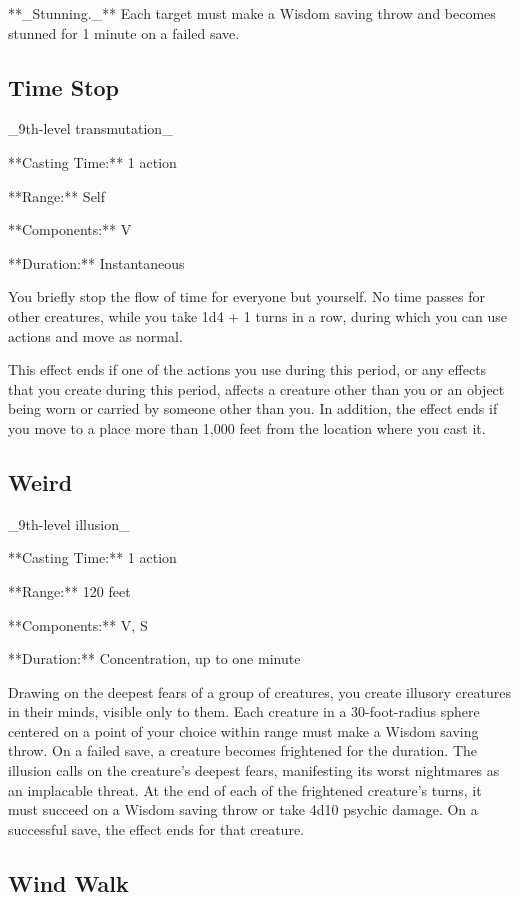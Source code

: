 **_Stunning._** Each target must make a Wisdom saving throw and becomes stunned for 1 minute on a failed save.

\subsection{Time Stop}

_9th-level transmutation_

**Casting Time:** 1 action

**Range:** Self

**Components:** V

**Duration:** Instantaneous

You briefly stop the flow of time for everyone but yourself. No time passes for other creatures, while you take 1d4 + 1 turns in a row, during which you can use actions and move as normal.

This effect ends if one of the actions you use during this period, or any effects that you create during this period, affects a creature other than you or an object being worn or carried by someone other than you. In addition, the effect ends if you move to a place more than 1,000 feet from the location where you cast it.

\subsection{Weird}

_9th-level illusion_

**Casting Time:** 1 action

**Range:** 120 feet

**Components:** V, S

**Duration:** Concentration, up to one minute

Drawing on the deepest fears of a group of creatures, you create illusory creatures in their minds, visible only to them. Each creature in a 30-foot-radius sphere centered on a point of your choice within range must make a Wisdom saving throw. On a failed save, a creature becomes frightened for the duration. The illusion calls on the creature’s deepest fears, manifesting its worst nightmares as an implacable threat. At the end of each of the frightened creature’s turns, it must succeed on a Wisdom saving throw or take 4d10 psychic damage. On a successful save, the effect ends for that creature.

\subsection{Wind Walk}

